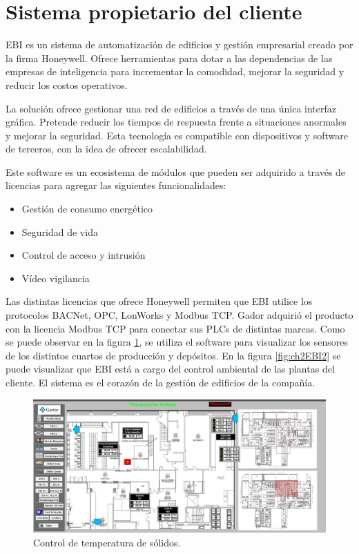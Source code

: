 \section{Sistema propietario del cliente}

EBI es un sistema de automatización de edificios y gestión empresarial creado por la firma Honeywell.
Ofrece herramientas para dotar a las dependencias de las empresas de inteligencia para incrementar la comodidad, mejorar la seguridad y reducir los costos operativos.

La solución ofrece gestionar una red de edificios a través de una única interfaz gráfica. Pretende reducir los tiempos de respuesta frente a situaciones anormales y mejorar la seguridad.
Esta tecnología es compatible con dispositivos y software de terceros, con la idea de ofrecer escalabilidad.

Este software es un ecosistema de módulos que pueden ser adquirido a través de licencias para agregar las siguientes funcionalidades:

\begin{itemize}
	\item Gestión de consumo energético
	\item Seguridad de vida
	\item Control de acceso y intrusión
	\item Vídeo vigilancia
\end{itemize}

Las distintas licencias que ofrece Honeywell permiten que EBI utilice los protocolos BACNet, OPC, LonWorks y Modbus TCP.
Gador adquirió el producto con la licencia Modbus TCP para conectar sus PLCs de distintas marcas.
Como se puede observar en la figura \ref{fig:ch2EBI1}, se utiliza el software para visualizar los sensores de los distintos cuartos de producción y depósitos.
En la figura \ref{fig:ch2EBI2} se puede visualizar que EBI está a cargo del control ambiental de las plantas del cliente.
El sistema es el corazón de la gestión de edificios de la compañía.

\begin{figure}[h]
	\centering
	\includegraphics[width=\textwidth]{./Figures/ch2EBI1.jpg}
	\caption{Control de temperatura de sólidos.}
	\label{fig:ch2EBI1}
\end{figure}

